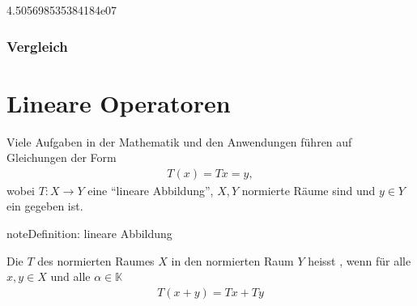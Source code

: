 \documentclass[letterpaper,10pt,english]{jupyterBook}
\begin{document}
\begin{sphinxVerbatim}[commandchars=\\\{\}]
\PYGZhy{}4.505698535384184e\PYGZhy{}07
\end{sphinxVerbatim}


\subsection{Vergleich}
\label{\detokenize{Funktionalanalysis/BeispielFourierEntwicklung:vergleich}}
\begin{sphinxVerbatim}[commandchars=\\\{\}]
 
 
\end{sphinxVerbatim}

\noindent{}


\chapter{Lineare Operatoren}
\label{\detokenize{Funktionalanalysis/LineareOperatoren:lineare-operatoren}}\label{\detokenize{Funktionalanalysis/LineareOperatoren::doc}}
Viele Aufgaben in der Mathematik und den Anwendungen führen auf Gleichungen der Form
\begin{equation*}
\begin{split}T(x) = T x = y,\end{split}
\end{equation*}
wobei \(T: X \to Y\) eine “lineare Abbildung”, \(X, Y\) normierte Räume sind und \(y\in Y\) ein gegeben ist.

\begin{sphinxadmonition}{note}{Definition: lineare Abbildung}

Die  \(T\) des normierten Raumes \(X\) in den normierten Raum \(Y\) heisst , wenn für alle \(x,y \in X\) und alle \(\alpha \in \mathbb{K}\)
\begin{equation*}
\begin{split}T(x+y) = T x + T y\end{split}
\end{equation*}\end{sphinxadmonition}
\end{document}
